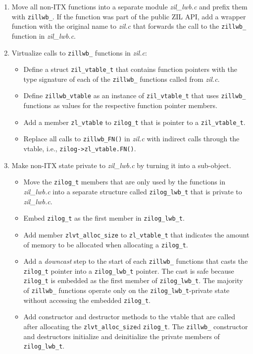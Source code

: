 \documentclass[12pt,a4paper,twoside]{book}
\begin{document}
\begin{enumerate}[noitemsep]
    \item Move all non-ITX functions into a separate module \textit{zil\_lwb.c} and prefix them with \lstinline{zillwb_}.
          If the function was part of the public ZIL API, add a wrapper function with the original name to \textit{zil.c} that forwards the call to the \lstinline{zillwb_} function in \textit{zil\_lwb.c}.
    \item Virtualize calls to \lstinline{zillwb_} functions in \textit{zil.c}:
          \begin{itemize}
              \item Define a struct \lstinline{zil_vtable_t} that contains function pointers with the type signature of each of the \lstinline{zillwb_} functions called from \textit{zil.c}.
              \item Define \lstinline{zillwb_vtable} as an instance of \lstinline{zil_vtable_t} that uses \lstinline{zillwb_} functions as values for the respective function pointer members.
              \item Add a member \lstinline{zl_vtable} to \lstinline{zilog_t} that is pointer to a \lstinline{zil_vtable_t}.
              \item Replace all calls to \lstinline{zillwb_FN()} in \textit{zil.c} with indirect calls through the vtable, i.e., \lstinline{zilog->zl_vtable.FN()}.
          \end{itemize}
    \item Make non-ITX state private to \textit{zil\_lwb.c} by turning it into a sub-object.
          \begin{itemize}
              \item Move the \lstinline{zilog_t} members that are only used by the functions in \textit{zil\_lwb.c} into a separate structure called \lstinline{zilog_lwb_t} that is private to \textit{zil\_lwb.c}.
              \item Embed \lstinline{zilog_t} as the first member in \lstinline{zilog_lwb_t}.
              \item Add member \lstinline{zlvt_alloc_size} to \lstinline{zl_vtable_t} that indicates the amount of memory to be allocated when allocating a \lstinline{zilog_t}.
              \item Add a \textit{downcast} step to the start of each \lstinline{zillwb_} functions that casts the \lstinline{zilog_t} pointer into a \lstinline{zilog_lwb_t} pointer.
                The cast is safe because \lstinline{zilog_t} is embedded as the first member of \lstinline{zilog_lwb_t}.
                The majority of \lstinline{zillwb_} functions operate only on the \lstinline{zilog_lwb_t}-private state without accessing the embedded \lstinline{zilog_t}.
              \item Add constructor and destructor methods to the vtable that are called after allocating the \lstinline{zlvt_alloc_size}d \lstinline{zilog_t}.
                The \lstinline{zillwb_} constructor and destructors initialize and deinitialize the private members of \lstinline{zilog_lwb_t}.
          \end{itemize}
\end{enumerate}
\end{document}
